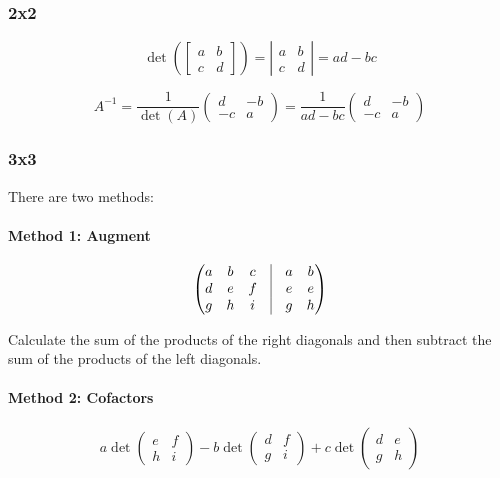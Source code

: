 \documentclass[12pt]{article}
\begin{document}
\begin{itemize}
\subsubsection{2x2}
\begin{equation*}
\det\left(\left[\begin{array}{cc}a&b\\c&d\end{array}\right]\right) = \left| \begin{array}{cc}a&b\\c&d\end{array}\right| = ad-bc
\end{equation*}

\begin{equation*}
A^{-1} = \frac{1}{\det(A)} \begin{pmatrix}d&-b\\-c&a\end{pmatrix} = \frac{1}{ad-bc}\begin{pmatrix}d&-b\\-c&a\end{pmatrix}
\end{equation*}

\subsubsection{3x3}
There are two methods:

\paragraph{Method 1: Augment}
\begin{equation*}
\begin{pmatrix}
a & b & c & \vline & a & b\\
d & e & f & \vline & e & e\\
g & h & i & \vline & g & h
\end{pmatrix}
\end{equation*}

Calculate the sum of the products of the right diagonals and then subtract the sum of the products of the left diagonals.

\paragraph{Method 2: Cofactors}
\begin{equation*}
a \det \begin{pmatrix}e&f\\h&i\end{pmatrix} - b \det \begin{pmatrix}d&f\\g&i\end{pmatrix} + c \det \begin{pmatrix}d&e\\g&h\end{pmatrix}
\end{equation*}


\end{itemize}
\end{document}
